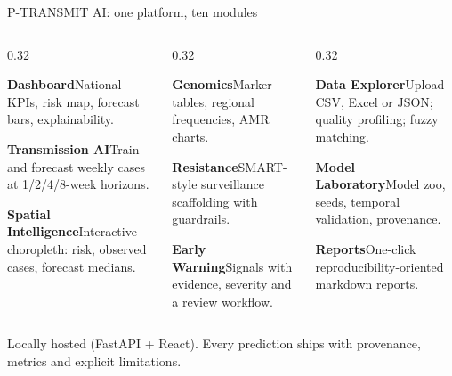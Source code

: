 \documentclass[aspectratio=169,11pt]{beamer}
\begin{document}
\begin{frame}{P-TRANSMIT AI: one platform, ten modules}
  \small
  \begin{columns}[c]
    \begin{column}{0.32\textwidth}
      \begin{block}{\textbf{Dashboard}}\scriptsize National KPIs, risk map, forecast bars, explainability.\end{block}
      \begin{block}{\textbf{Transmission AI}}\scriptsize Train and forecast weekly cases at 1/2/4/8-week horizons.\end{block}
      \begin{block}{\textbf{Spatial Intelligence}}\scriptsize Interactive choropleth: risk, observed cases, forecast medians.\end{block}
    \end{column}
    \begin{column}{0.32\textwidth}
      \begin{block}{\textbf{Genomics}}\scriptsize Marker tables, regional frequencies, AMR charts.\end{block}
      \begin{block}{\textbf{Resistance}}\scriptsize SMART-style surveillance scaffolding with guardrails.\end{block}
      \begin{block}{\textbf{Early Warning}}\scriptsize Signals with evidence, severity and a review workflow.\end{block}
    \end{column}
    \begin{column}{0.32\textwidth}
      \begin{block}{\textbf{Data Explorer}}\scriptsize Upload CSV, Excel or JSON; quality profiling; fuzzy matching.\end{block}
      \begin{block}{\textbf{Model Laboratory}}\scriptsize Model zoo, seeds, temporal validation, provenance.\end{block}
      \begin{block}{\textbf{Reports}}\scriptsize One-click reproducibility-oriented markdown reports.\end{block}
    \end{column}
  \end{columns}
  \vspace{2mm}
  \centering
  \begin{alertblock}{}
    Locally hosted (FastAPI + React). Every prediction ships with provenance,
    metrics and explicit limitations.
  \end{alertblock}
\end{frame}
\end{document}
